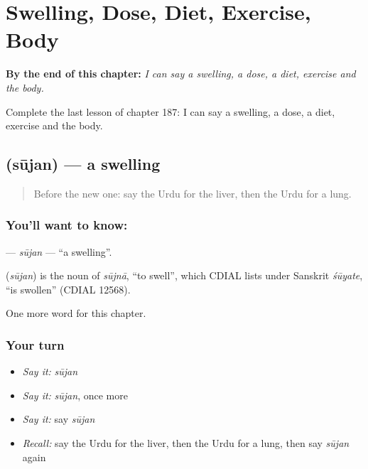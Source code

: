 
\chapter{Swelling, Dose, Diet, Exercise, Body}
\label{ch:ur-swelling-dose-diet-exercise-body}

\begin{chapteropening}
\textbf{By the end of this chapter:} \emph{I can say a swelling, a dose, a diet, exercise and the body.}

Complete the last lesson of chapter 187: I can say a swelling, a dose, a diet, exercise and the body.
\end{chapteropening}

\section[\texorpdfstring{\ur{سوجن} (sūjan)}{سوجن (sūjan)}]{ (sūjan) — a swelling}

\label{lesson:UR-C187-sujan}



\begin{quote}
Before the new one: say the Urdu for the liver, then the Urdu for a lung.
\end{quote}

\subsection*{You'll want to know: }
\textbf{} — \emph{sūjan} — \textquotedblleft{}a swelling\textquotedblright{}.

\begin{cousinweb}
\textbf{} (\emph{sūjan}) is the noun of \emph{sūjnā}, \textquotedblleft{}to swell\textquotedblright{}, which CDIAL lists under Sanskrit \emph{śūyate}, \textquotedblleft{}is swollen\textquotedblright{} (CDIAL 12568).
\end{cousinweb}

\begin{grammarlens}[title={What you've built}]
One more word for this chapter.
\end{grammarlens}

\subsection*{Your turn}
\begin{itemize}
\raggedright
  \item \emph{Say it:} \emph{sūjan}
  \item \emph{Say it:} \emph{sūjan}, once more
  \item \emph{Say it:} say \emph{sūjan}
  \item \emph{Recall:} say the Urdu for the liver, then the Urdu for a lung, then say \emph{sūjan} again
\end{itemize}

